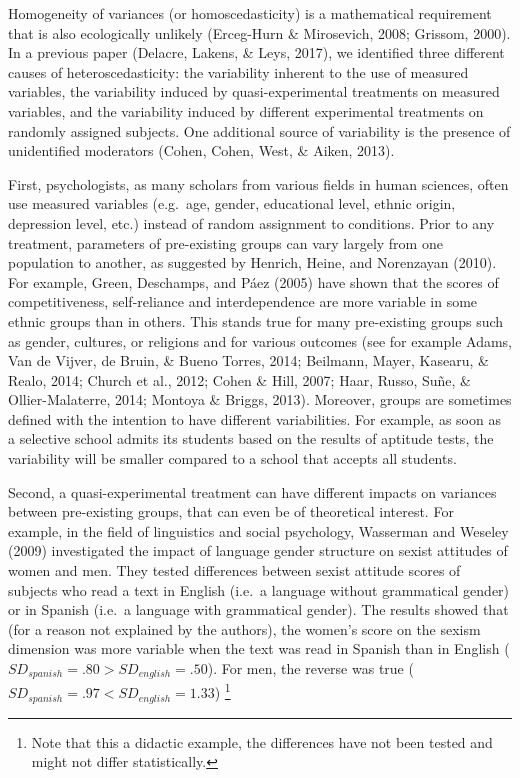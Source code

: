 \documentclass[man,floatsintext]{apa6}
\let\rmarkdownfootnote\footnote%
\def\footnote{\protect\rmarkdownfootnote}
\begin{document}
Homogeneity of variances (or homoscedasticity) is a mathematical requirement that is also ecologically unlikely (Erceg-Hurn \& Mirosevich, 2008; Grissom, 2000). In a previous paper (Delacre, Lakens, \& Leys, 2017), we identified three different causes of heteroscedasticity: the variability inherent to the use of measured variables, the variability induced by quasi-experimental treatments on measured variables, and the variability induced by different experimental treatments on randomly assigned subjects. One additional source of variability is the presence of unidentified moderators (Cohen, Cohen, West, \& Aiken, 2013).

First, psychologists, as many scholars from various fields in human sciences, often use measured variables (e.g.~age, gender, educational level, ethnic origin, depression level, etc.) instead of random assignment to conditions. Prior to any treatment, parameters of pre-existing groups can vary largely from one population to another, as suggested by Henrich, Heine, and Norenzayan (2010). For example, Green, Deschamps, and Páez (2005) have shown that the scores of competitiveness, self-reliance and interdependence are more variable in some ethnic groups than in others. This stands true for many pre-existing groups such as gender, cultures, or religions and for various outcomes (see for example Adams, Van de Vijver, de Bruin, \& Bueno Torres, 2014; Beilmann, Mayer, Kasearu, \& Realo, 2014; Church et al., 2012; Cohen \& Hill, 2007; Haar, Russo, Suñe, \& Ollier-Malaterre, 2014; Montoya \& Briggs, 2013). Moreover, groups are sometimes defined with the intention to have different variabilities. For example, as soon as a selective school admits its students based on the results of aptitude tests, the variability will be smaller compared to a school that accepts all students.

Second, a quasi-experimental treatment can have different impacts on variances between pre-existing groups, that can even be of theoretical interest. For example, in the field of linguistics and social psychology, Wasserman and Weseley (2009) investigated the impact of language gender structure on sexist attitudes of women and men. They tested differences between sexist attitude scores of subjects who read a text in English (i.e.~a language without grammatical gender) or in Spanish (i.e.~a language with grammatical gender). The results showed that (for a reason not explained by the authors), the women's score on the sexism dimension was more variable when the text was read in Spanish than in English (\(SD_{spanish}=.80 > SD_{english}=.50\)). For men, the reverse was true (\(SD_{spanish}=.97 < SD_{english}=1.33\)) \footnote{Note that this a didactic example, the differences have not been tested and might not differ statistically.}
\end{document}
